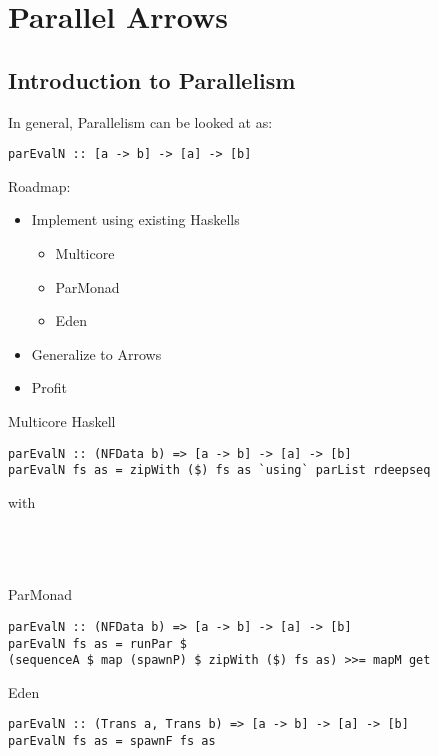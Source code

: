 \section{Parallel Arrows}
\subsection{Introduction to Parallelism}
\begin{frame}[fragile]
In general, Parallelism can be looked at as:
\begin{lstlisting}[frame=htrbl]
parEvalN :: [a -> b] -> [a] -> [b]
\end{lstlisting}

Roadmap:
\begin{itemize}
\item Implement using existing Haskells
\begin{itemize}
\item Multicore
\item ParMonad
\item Eden
\end{itemize}
\item Generalize to Arrows
\item Profit
\end{itemize}
\end{frame}

\begin{frame}[fragile]{Multicore Haskell}
\begin{lstlisting}[frame=htrbl]
parEvalN :: (NFData b) => [a -> b] -> [a] -> [b]
parEvalN fs as = zipWith ($) fs as `using` parList rdeepseq
\end{lstlisting}
with
\\~\\
\\
\\
\end{frame}

\begin{frame}[fragile]{ParMonad}
\begin{lstlisting}[frame=htrbl]
parEvalN :: (NFData b) => [a -> b] -> [a] -> [b]
parEvalN fs as = runPar $ 
(sequenceA $ map (spawnP) $ zipWith ($) fs as) >>= mapM get
\end{lstlisting}
\vfill
\end{frame}

\begin{frame}[fragile]{Eden}
\begin{lstlisting}[frame=htrbl]
parEvalN :: (Trans a, Trans b) => [a -> b] -> [a] -> [b]
parEvalN fs as = spawnF fs as
\end{lstlisting}
\end{frame}